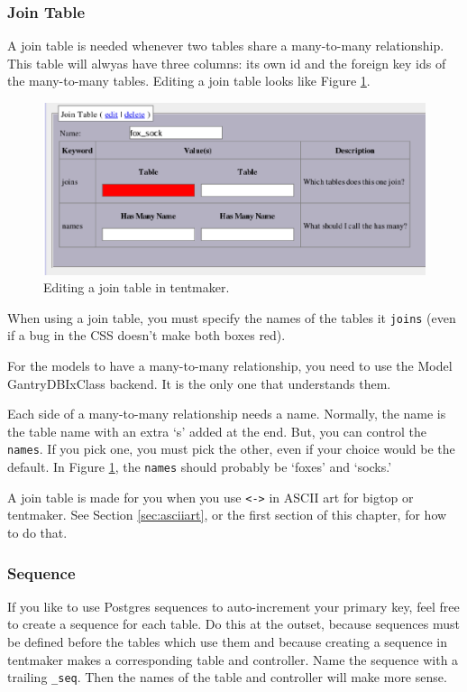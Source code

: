 \subsubsection*{Join Table}

A join table is needed whenever two tables share a many-to-many
relationship.  This table will alwyas have three columns: its own id
and the foreign key ids of the many-to-many tables.  Editing a join
table looks like Figure \ref{fig:joiner}.

\begin{figure}
\includegraphics[width=6in]{joiner}
\caption{Editing a join table in tentmaker.}
\label{fig:joiner}
\end{figure}

When using a join table, you must specify the names of the tables it
\verb+joins+ (even if a bug in the CSS doesn't make both boxes red).

For the models to have a many-to-many relationship, you need to use
the Model GantryDBIxClass backend.  It is the only one that understands
them.

Each side of a many-to-many relationship needs a name.  Normally, the
name is the table name with an extra `s' added at the end.  But,
you can control the \verb+names+.  If you pick one, you must pick the
other, even if your choice would be the default.  In Figure \ref{fig:joiner},
the \verb+names+ should probably be `foxes' and `socks.'

A join table is made for you when you use \verb+<->+ in ASCII art for
bigtop or tentmaker.  See Section \ref{sec:asciiart}, or the first section
of this chapter, for how to do that.

\subsubsection*{Sequence}

If you like to use Postgres sequences to auto-increment your primary key,
feel free to create a sequence for each table.  Do this at the outset,
because sequences must be defined before the tables which use them and
because creating a sequence in tentmaker makes a corresponding table
and controller.  Name the sequence with a trailing \verb+_seq+.  Then
the names of the table and controller will make more sense.

